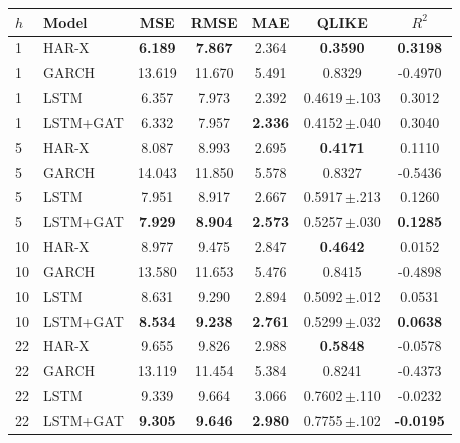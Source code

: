 \begin{tabular}{llccccc}
\toprule
$h$ & Model & MSE & RMSE & MAE & QLIKE & $R^2$ \\
\midrule
1 & HAR-X & \textbf{6.189} & \textbf{7.867} & 2.364 & \textbf{0.3590} & \textbf{0.3198} \\
1 & GARCH & 13.619 & 11.670 & 5.491 & 0.8329 & -0.4970 \\
1 & LSTM & 6.357 & 7.973 & 2.392 & 0.4619\,$\pm$.103 & 0.3012 \\
1 & LSTM+GAT & 6.332 & 7.957 & \textbf{2.336} & 0.4152\,$\pm$.040 & 0.3040 \\
\midrule
5 & HAR-X & 8.087 & 8.993 & 2.695 & \textbf{0.4171} & 0.1110 \\
5 & GARCH & 14.043 & 11.850 & 5.578 & 0.8327 & -0.5436 \\
5 & LSTM & 7.951 & 8.917 & 2.667 & 0.5917\,$\pm$.213 & 0.1260 \\
5 & LSTM+GAT & \textbf{7.929} & \textbf{8.904} & \textbf{2.573} & 0.5257\,$\pm$.030 & \textbf{0.1285} \\
\midrule
10 & HAR-X & 8.977 & 9.475 & 2.847 & \textbf{0.4642} & 0.0152 \\
10 & GARCH & 13.580 & 11.653 & 5.476 & 0.8415 & -0.4898 \\
10 & LSTM & 8.631 & 9.290 & 2.894 & 0.5092\,$\pm$.012 & 0.0531 \\
10 & LSTM+GAT & \textbf{8.534} & \textbf{9.238} & \textbf{2.761} & 0.5299\,$\pm$.032 & \textbf{0.0638} \\
\midrule
22 & HAR-X & 9.655 & 9.826 & 2.988 & \textbf{0.5848} & -0.0578 \\
22 & GARCH & 13.119 & 11.454 & 5.384 & 0.8241 & -0.4373 \\
22 & LSTM & 9.339 & 9.664 & 3.066 & 0.7602\,$\pm$.110 & -0.0232 \\
22 & LSTM+GAT & \textbf{9.305} & \textbf{9.646} & \textbf{2.980} & 0.7755\,$\pm$.102 & \textbf{-0.0195} \\
\bottomrule
\end{tabular}
